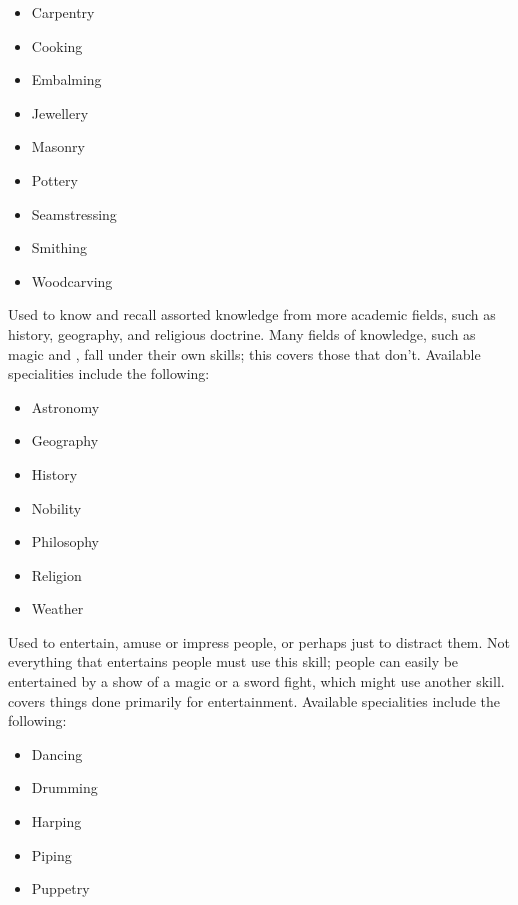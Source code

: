 \begin{itemize}
	\item Carpentry
	\item Cooking
	\item Embalming
	\item Jewellery
	\item Masonry
	\item Pottery
	\item Seamstressing
	\item Smithing
	\item Woodcarving
\end{itemize}


Used to know and recall assorted knowledge from more academic fields, such as history, geography, and religious doctrine. %
Many fields of knowledge, such as magic and , fall under their own skills; this covers those that don't.
Available specialities include the following:

\begin{itemize}
	\item Astronomy
	\item Geography
	\item History
	\item Nobility
	\item Philosophy
	\item Religion %
	\item Weather
\end{itemize}


Used to entertain, amuse or impress people, or perhaps just to distract them.
Not everything that entertains people must use this skill; people can easily be entertained by a show of a magic or a sword fight, which might use another skill.
 covers things done primarily for entertainment.
Available specialities include the following:

\begin{itemize}
	\item Dancing
	\item Drumming
	\item Harping
	\item Piping
	\item Puppetry
\end{itemize}
